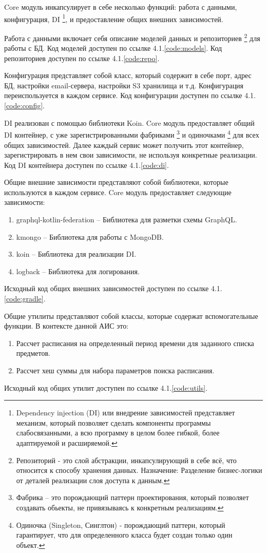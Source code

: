 Core модуль инкапсулирует в себе несколько функций: работа с данными, конфигурация, DI
\footnote{Dependency injection (DI) или внедрение зависимостей представляет механизм, который позволяет сделать компоненты программы слабосвязанными, 
а всю программу в целом более гибкой, более адаптируемой и расширяемой.
}, и предоставление общих внешних зависимостей.

Работа с данными включает себя описание моделей данных и репозиториев
\footnote{Репозиторий - это слой абстракции, инкапсулирующий в себе всё, что относится к способу хранения данных. 
Назначение: Разделение бизнес-логики от деталей реализации слоя доступа к данным.}
для работы с БД. Код моделей доступен по ссылке 4.1.\ref{code:models}. Код репозиториев доступен по ссылке 4.1.\ref{code:repo}.

Конфигурация представляет собой класс, который содержит в себе порт, 
адрес БД, настройки email-сервера, настройки S3 хранилища и т.д.
Конфигурация переиспользуется в каждом сервисе.
Код конфигурации доступен по ссылке 4.1.\ref{code:config}.

DI реализован с помощью библиотеки Koin. Core модуль предоставляет общий DI контейнер, 
с уже зарегистрированными фабриками
\footnote{Фабрика – это порождающий паттерн проектирования, который позволяет создавать обьекты, не привязываясь к конкретным реализациям.}
и одиночками 
\footnote{Одиночка (Singleton, Синглтон) - порождающий паттерн, который гарантирует, что для определенного класса будет создан только один объект.}
для всех общих зависимостей. Далее каждый сервис может получить этот контейнер, 
зарегистрировать в нем свои зависимости, не используя конкретные реализации.
Код DI контейнера доступен по ссылке 4.1.\ref{code:di}.

Общие внешние зависимости представляют собой библиотеки, которые используются в каждом сервисе. 
Core модуль предоставляет следующие зависимости:
\begin{enumerate}
  \item graphql-kotlin-federation -- Библиотека для разметки схемы GraphQL.
  \item kmongo -- Библиотека для работы с MongoDB.
  \item koin -- Библиотека для реализации DI.
  \item logback -- Библиотека для логирования.
\end{enumerate}
Исходный код общих внешних зависимостей доступен по ссылке 4.1.\ref{code:gradle}.

Общие утилиты представляют собой классы, которые содержат вспомогательные функции. В контексте данной АИС это:
\begin{enumerate}
  \item Рассчет расписания на определенный период времени для заданного списка предметов.
  \item Рассчет хеш суммы для набора параметров поиска расписания.
\end{enumerate}
Исходный код общих утилит доступен по ссылке 4.1.\ref{code:utils}.

